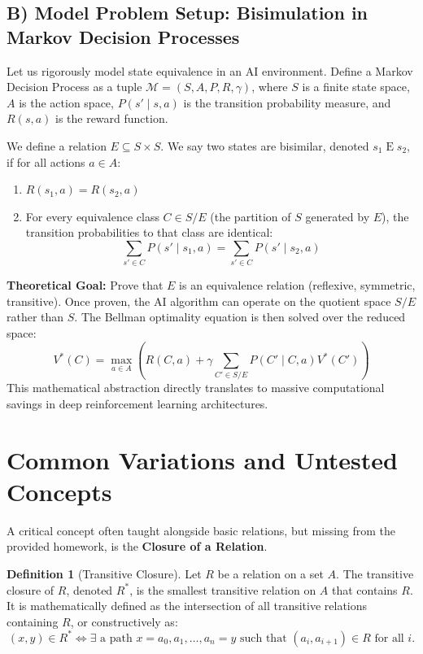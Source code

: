 \documentclass[11pt, a4paper]{article}
\theoremstyle{definition}
\newtheorem{definition}{Definition}[section]
\theoremstyle{remark}
\begin{document}
\subsection{B) Model Problem Setup: Bisimulation in Markov Decision Processes}
Let us rigorously model state equivalence in an AI environment. 
Define a Markov Decision Process as a tuple $\mathcal{M} = (S, A, P, R, \gamma)$, where $S$ is a finite state space, $A$ is the action space, $P(s' \mid s, a)$ is the transition probability measure, and $R(s, a)$ is the reward function.

We define a relation $E \subseteq S \times S$. We say two states are bisimilar, denoted $s_1 \mathrel{E} s_2$, if for all actions $a \in A$:
\begin{enumerate}
    \item $R(s_1, a) = R(s_2, a)$
    \item For every equivalence class $C \in S/E$ (the partition of $S$ generated by $E$), the transition probabilities to that class are identical:
    \[ \displaystyle \sum_{s' \in C} P(s' \mid s_1, a) = \sum_{s' \in C} P(s' \mid s_2, a) \]
\end{enumerate}
\textbf{Theoretical Goal:} Prove that $E$ is an equivalence relation (reflexive, symmetric, transitive). Once proven, the AI algorithm can operate on the quotient space $S/E$ rather than $S$. The Bellman optimality equation is then solved over the reduced space:
\[ \displaystyle V^*(C) = \max_{a \in A} \left( R(C, a) + \gamma \sum_{C' \in S/E} P(C' \mid C, a) V^*(C') \right) \]
This mathematical abstraction directly translates to massive computational savings in deep reinforcement learning architectures.

\newpage

\section{Common Variations and Untested Concepts}

A critical concept often taught alongside basic relations, but missing from the provided homework, is the \textbf{Closure of a Relation}.

\begin{definition}[Transitive Closure]
Let $R$ be a relation on a set $A$. The transitive closure of $R$, denoted $R^*$, is the smallest transitive relation on $A$ that contains $R$. It is mathematically defined as the intersection of all transitive relations containing $R$, or constructively as:
\[ \displaystyle (x, y) \in R^* \iff \exists \text{ a path } x = a_0, a_1, \dots, a_n = y \text{ such that } (a_i, a_{i+1}) \in R \text{ for all } i. \]
\end{definition}
\end{document}
